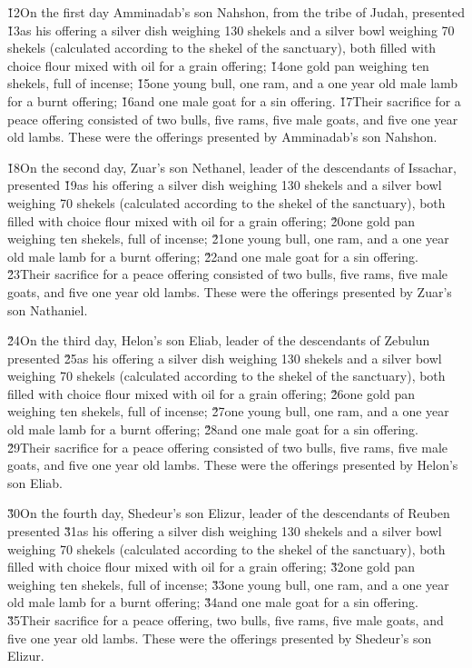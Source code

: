 \v{12}On the first day Amminadab's son Nahshon, from the tribe of Judah, presented \v{13}as his offering a silver dish weighing 130 shekels and a silver bowl weighing 70 shekels (calculated according to the shekel of the sanctuary), both filled with choice flour mixed with oil for a grain offering; \v{14}one gold pan weighing ten shekels, full of incense; \v{15}one young bull, one ram, and a one year old male lamb for a burnt offering; \v{16}and one male goat for a sin offering. \v{17}Their sacrifice for a peace offering consisted of two bulls, five rams, five male goats, and five one year old lambs. These were the offerings presented by Amminadab's son Nahshon.

\v{18}On the second day, Zuar's son Nethanel, leader of the descendants of Issachar, presented \v{19}as his offering a silver dish weighing 130 shekels and a silver bowl weighing 70 shekels (calculated according to the shekel of the sanctuary), both filled with choice flour mixed with oil for a grain offering; \v{20}one gold pan weighing ten shekels, full of incense; \v{21}one young bull, one ram, and a one year old male lamb for a burnt offering; \v{22}and one male goat for a sin offering. \v{23}Their sacrifice for a peace offering consisted of two bulls, five rams, five male goats, and five one year old lambs. These were the offerings presented by Zuar's son Nathaniel.

\v{24}On the third day, Helon's son Eliab, leader of the descendants of Zebulun presented \v{25}as his offering a silver dish weighing 130 shekels and a silver bowl weighing 70 shekels (calculated according to the shekel of the sanctuary), both filled with choice flour mixed with oil for a grain offering; \v{26}one gold pan weighing ten shekels, full of incense; \v{27}one young bull, one ram, and a one year old male lamb for a burnt offering; \v{28}and one male goat for a sin offering. \v{29}Their sacrifice for a peace offering consisted of two bulls, five rams, five male goats, and five one year old lambs. These were the offerings presented by Helon's son Eliab.

\v{30}On the fourth day, Shedeur's son Elizur, leader of the descendants of Reuben presented \v{31}as his offering a silver dish weighing 130 shekels and a silver bowl weighing 70 shekels (calculated according to the shekel of the sanctuary), both filled with choice flour mixed with oil for a grain offering; \v{32}one gold pan weighing ten shekels, full of incense; \v{33}one young bull, one ram, and a one year old male lamb for a burnt offering; \v{34}and one male goat for a sin offering. \v{35}Their sacrifice for a peace offering, two bulls, five rams, five male goats, and five one year old lambs. These were the offerings presented by Shedeur's son Elizur.

